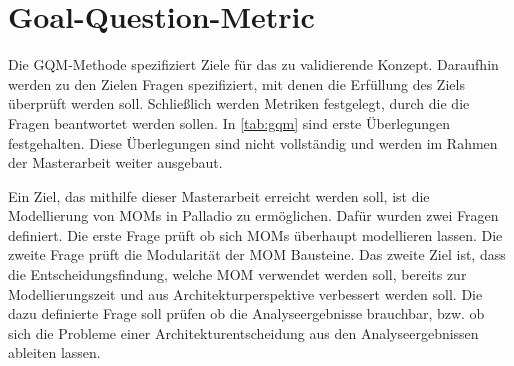 \section{Goal-Question-Metric}
Die GQM-Methode \cite{gqm} spezifiziert Ziele für das zu validierende Konzept. Daraufhin werden zu den Zielen Fragen spezifiziert, mit denen die Erfüllung des Ziels überprüft werden soll. Schließlich werden Metriken festgelegt, durch die die Fragen beantwortet werden sollen. In \autoref{tab:gqm} sind erste Überlegungen festgehalten. Diese Überlegungen sind nicht vollständig und werden im Rahmen der Masterarbeit weiter ausgebaut.\par
Ein Ziel, das mithilfe dieser Masterarbeit erreicht werden soll, ist die Modellierung von MOMs in Palladio zu ermöglichen. Dafür wurden zwei Fragen definiert. Die erste Frage prüft ob sich MOMs überhaupt modellieren lassen. Die zweite Frage prüft die Modularität der MOM Bausteine. Das zweite Ziel ist, dass die Entscheidungsfindung, welche MOM verwendet werden soll, bereits zur Modellierungszeit und aus Architekturperspektive verbessert werden soll. Die dazu definierte Frage soll prüfen ob die Analyseergebnisse brauchbar, bzw. ob sich die Probleme einer Architekturentscheidung aus den Analyseergebnissen ableiten lassen. 
